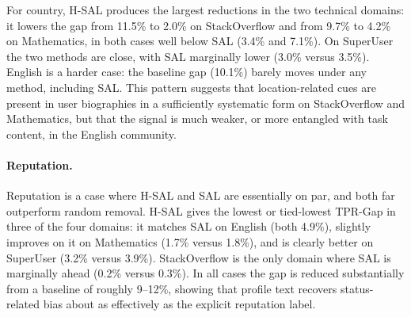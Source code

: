 \documentclass[11pt]{article}
\begin{document}
For country, H-SAL produces the largest reductions in the two technical domains: it lowers the gap from 11.5\% to 2.0\% on StackOverflow and from 9.7\% to 4.2\% on Mathematics, in both cases well below SAL (3.4\% and 7.1\%). On SuperUser the two methods are close, with SAL marginally lower (3.0\% versus 3.5\%). English is a harder case: the baseline gap (10.1\%) barely moves under any method, including SAL. This pattern suggests that location-related cues are present in user biographies in a sufficiently systematic form on StackOverflow and Mathematics, but that the signal is much weaker, or more entangled with task content, in the English community.



\paragraph{Reputation.}

Reputation is a case where H-SAL and SAL are essentially on par, and both far outperform random removal. H-SAL gives the lowest or tied-lowest TPR-Gap in three of the four domains: it matches SAL on English (both 4.9\%), slightly improves on it on Mathematics (1.7\% versus 1.8\%), and is clearly better on SuperUser (3.2\% versus 3.9\%). StackOverflow is the only domain where SAL is marginally ahead (0.2\% versus 0.3\%). In all cases the gap is reduced substantially from a baseline of roughly 9--12\%, showing that profile text recovers status-related bias about as effectively as the explicit reputation label.
\end{document}
